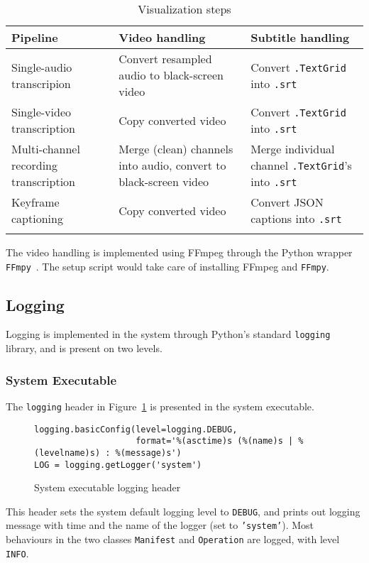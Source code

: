 \begin{longtabu}{X[1,l]X[2,l]X[2,l]}
    \textbf{Pipeline} & \textbf{Video handling}
    & \textbf{Subtitle handling} \\
    \midrule
    \endhead{}
    Single-audio transcripion &
    Convert resampled audio to black-screen video &
    Convert \texttt{.TextGrid} into \texttt{.srt} \\
    Single-video transcription &
    Copy converted video &
    Convert \texttt{.TextGrid} into \texttt{.srt} \\
    Multi-channel recording transcription &
    Merge (clean) channels into audio, convert to black-screen video &
    Merge individual channel \texttt{.TextGrid}'s into \texttt{.srt} \\
    Keyframe captioning &
    Copy converted video &
    Convert JSON captions into \texttt{.srt} \\
    \caption{Visualization steps}\label{viz}
\end{longtabu}

The video handling is implemented using FFmpeg through the Python wrapper
\texttt{FFmpy}~\cite{ffmpy}. The setup script would take care of installing
FFmpeg and \texttt{FFmpy}.

\subsection{Logging}\label{sec:im:code:log}

Logging is implemented in the system through Python's standard
\texttt{logging} library, and is present on two levels.

\subsubsection{System Executable}

The \texttt{logging} header in Figure~\ref{log-sys} is presented in the
system executable.

\begin{figure}[ht]
\begin{lstlisting}
logging.basicConfig(level=logging.DEBUG,
                    format='%(asctime)s (%(name)s | %(levelname)s) : %(message)s')
LOG = logging.getLogger('system')
\end{lstlisting}
\caption{System executable logging header}\label{log-sys}
\end{figure}

This header sets the system default logging level to \texttt{DEBUG}, and prints
out logging message with time and the name of the logger (set to \texttt{'system'}).
Most behaviours in the two classes \texttt{Manifest} and \texttt{Operation} are
logged, with level \texttt{INFO}.

